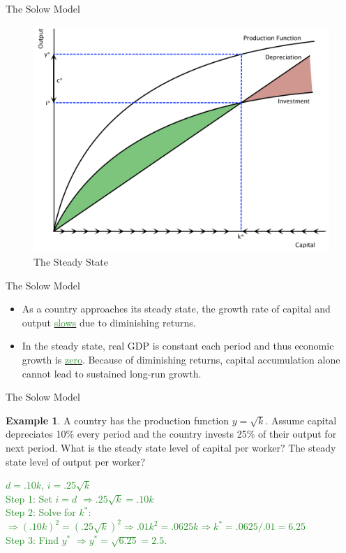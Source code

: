 \documentclass[xcolor={dvipsnames},pdf, hyperref={colorlinks=true, citecolor=ForestGreen, linkcolor=BlueViolet, urlcolor=Magenta}]{beamer}
\theoremstyle{definition}
\newtheorem{exmp}{Example}[section]
\newcommand{\ddp}[1]{{\textcolor{ForestGreen}{#1}}}
\newcommand{\dd}[1]{{\underline{\textcolor{ForestGreen}{#1}}}}
\begin{document}
\begin{frame}{The Solow Model}
\begin{figure}[H]
	\centering
	\includegraphics[scale=.35]{plot85.pdf}
	\caption{The Steady State}
\end{figure}
\end{frame}

\begin{frame}{The Solow Model}
\begin{itemize}
	\item As a country approaches its steady state, the growth rate of capital and output \dd{slows} due to diminishing returns. 
	\item In the steady state, real GDP is constant each period and thus economic growth is \dd{zero}. Because of diminishing returns, capital accumulation alone cannot lead to sustained long-run growth. 
\end{itemize}
\end{frame}

\begin{frame}{The Solow Model}
\begin{exmp} 
	A country has the production function $y = \sqrt{k}$. Assume capital depreciates 10\% every period and the country invests 25\% of their output for next period. What is the steady state level of capital per worker? The steady state level of output per worker? 
\end{exmp}

\ddp{$d = .10k$, $i=.25\sqrt{k}$ \\
	Step 1: Set $i = d$ \pause $\Rightarrow .25\sqrt{k} = .10k$ \\
	Step 2: Solve for $k^*$: \pause $\Rightarrow (.10k)^2 = (.25\sqrt{k})^2 \Rightarrow .01k^2 = .0625k \Rightarrow k^* = .0625/.01 = 6.25$ \\
	Step 3: Find $y^*$ \pause $\Rightarrow y^* = \sqrt{6.25} = 2.5$.}
\end{frame}
\end{document}
